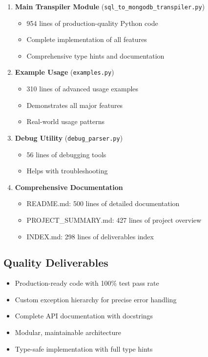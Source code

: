 \documentclass[12pt,a4paper]{article}
\begin{document}
\begin{enumerate}
    \item \textbf{Main Transpiler Module} (\texttt{sql\_to\_mongodb\_transpiler.py})
    \begin{itemize}
        \item 954 lines of production-quality Python code
        \item Complete implementation of all features
        \item Comprehensive type hints and documentation
    \end{itemize}
    
    \item \textbf{Example Usage} (\texttt{examples.py})
    \begin{itemize}
        \item 310 lines of advanced usage examples
        \item Demonstrates all major features
        \item Real-world usage patterns
    \end{itemize}
    
    \item \textbf{Debug Utility} (\texttt{debug\_parser.py})
    \begin{itemize}
        \item 56 lines of debugging tools
        \item Helps with troubleshooting
    \end{itemize}
    
    \item \textbf{Comprehensive Documentation}
    \begin{itemize}
        \item README.md: 500 lines of detailed documentation
        \item PROJECT\_SUMMARY.md: 427 lines of project overview
        \item INDEX.md: 298 lines of deliverables index
    \end{itemize}
\end{enumerate}

\subsection{Quality Deliverables}

\begin{itemize}
    \item Production-ready code with 100\% test pass rate
    \item Custom exception hierarchy for precise error handling
    \item Complete API documentation with docstrings
    \item Modular, maintainable architecture
    \item Type-safe implementation with full type hints
\end{itemize}
\end{document}
